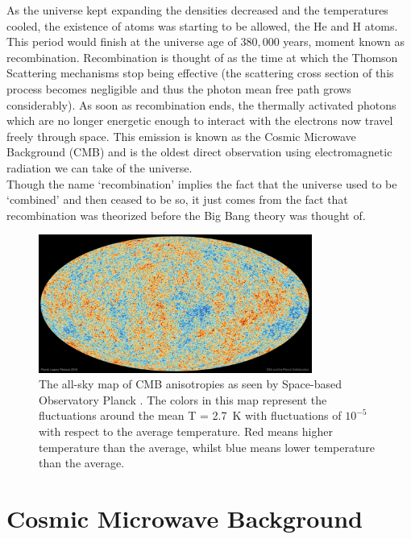 As the universe kept expanding the densities decreased and the temperatures cooled, the existence of atoms was starting to be allowed, the He and H atoms. This period would finish at the universe age of $380,000$ years, moment known as recombination. Recombination is thought of as the time at which the Thomson Scattering mechanisms stop being effective (the scattering cross section of this process becomes negligible and thus the photon mean free path grows considerably).
As soon as recombination ends, the thermally activated photons which are no longer energetic enough to interact with the electrons now travel freely through space. This emission is known as the Cosmic Microwave Background (CMB) and is the oldest direct observation using electromagnetic radiation we can take of the universe. \\

Though the name `recombination' implies the fact that the universe used to be `combined' and then ceased to be so, it just comes from the fact that recombination was theorized before the Big Bang theory was thought of. \\



\begin{figure}[t]
	\centering
	\includegraphics[width=0.8\textwidth]{../figs/cmb.jpeg}
	\caption[The all-sky map of CMB anisotropies as seen by space-based Observatory Planck]{The all-sky map of CMB anisotropies as seen by Space-based Observatory Planck \cite{Planck2018}. The colors in this map represent the fluctuations around the mean T = \SI{2.7}{K} with fluctuations of $10^{-5}$ with respect to the average temperature. Red means higher temperature than the average, whilst blue means lower temperature than the average.}
	\label{fig:cmb}
\end{figure}
\section{Cosmic Microwave Background}

